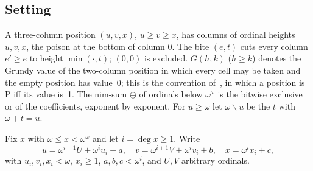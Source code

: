 \documentclass[11pt]{amsart}
\theoremstyle{definition}
\theoremstyle{remark}
\newcommand{\G}{G}
\newcommand{\nim}{\oplus}
\newcommand{\ldiv}{\mathbin{\backslash}}
\begin{document}
\subsection{Setting}
A three-column position $(u,v,x)$, $u\ge v\ge x$, has columns of ordinal heights $u,v,x$, the
poison at the bottom of column $0$. The bite $(e,t)$ cuts every column $e'\ge e$ to height
$\min(\cdot,t)$; $(0,0)$ is excluded. $\G(h,k)$ ($h\ge k$) denotes the Grundy value of the
two-column position in which every cell may be taken and the empty position has value~0; this
is the convention of~\cite{HS}, in which a position is P iff its value is~1. The nim-sum
$\nim$ of ordinals below $\omega^\omega$ is the bitwise exclusive or of the coefficients,
exponent by exponent. For $u\ge\omega$ let $\omega\ldiv u$ be the $t$ with $\omega+t=u$.

Fix $x$ with $\omega\le x<\omega^\omega$ and let $i=\deg x\ge1$. Write
\[
u=\omega^{i+1}U+\omega^iu_i+a,\quad v=\omega^{i+1}V+\omega^iv_i+b,\quad x=\omega^ix_i+c,
\]
with $u_i,v_i,x_i<\omega$, $x_i\ge1$, $a,b,c<\omega^i$, and $U,V$ arbitrary ordinals.
\end{document}
